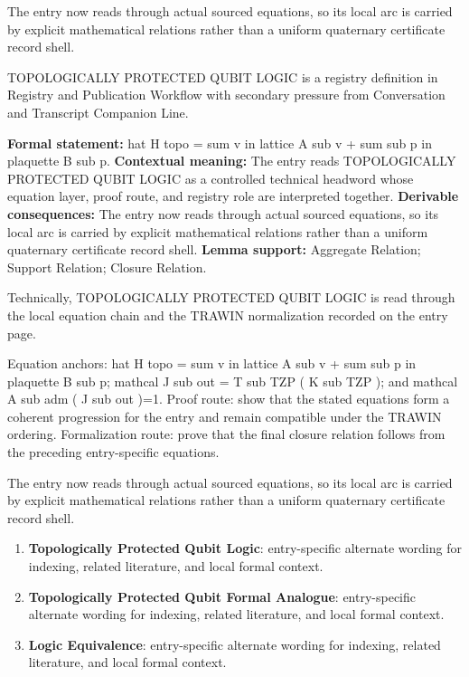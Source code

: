 The entry now reads through actual sourced equations, so its local arc is carried by explicit mathematical relations rather than a uniform quaternary certificate record shell.
\clearpage


\begingroup\small
{}
TOPOLOGICALLY PROTECTED QUBIT LOGIC is a registry definition in Registry and Publication Workflow with secondary pressure from Conversation and Transcript Companion Line.

\begingroup\footnotesize\setlength{\emergencystretch}{3em}\sloppy
\textbf{Formal statement:} hat H topo = sum v in lattice A sub v + sum sub p in plaquette B sub p. \textbf{Contextual meaning:} The entry reads TOPOLOGICALLY PROTECTED QUBIT LOGIC as a controlled technical headword whose equation layer, proof route, and registry role are interpreted together. \textbf{Derivable consequences:} The entry now reads through actual sourced equations, so its local arc is carried by explicit mathematical relations rather than a uniform quaternary certificate record shell. \textbf{Lemma support:} Aggregate Relation; Support Relation; Closure Relation.\par
\endgroup

Technically, TOPOLOGICALLY PROTECTED QUBIT LOGIC is read through the local equation chain and the TRAWIN normalization recorded on the entry page.

Equation anchors: hat H topo = sum v in lattice A sub v + sum sub p in plaquette B sub p; mathcal J sub out = T sub TZP ( K sub TZP ); and mathcal A sub adm ( J sub out )=1. Proof route: show that the stated equations form a coherent progression for the entry and remain compatible under the TRAWIN ordering. Formalization route: prove that the final closure relation follows from the preceding entry-specific equations.

The entry now reads through actual sourced equations, so its local arc is carried by explicit mathematical relations rather than a uniform quaternary certificate record shell.
\endgroup

\begin{enumerate}[leftmargin=1.6em,itemsep=6pt,topsep=4pt]
\item \textbf{Topologically Protected Qubit Logic}: entry-specific alternate wording for indexing, related literature, and local formal context.
\item \textbf{Topologically Protected Qubit Formal Analogue}: entry-specific alternate wording for indexing, related literature, and local formal context.
\item \textbf{Logic Equivalence}: entry-specific alternate wording for indexing, related literature, and local formal context.
\end{enumerate}

